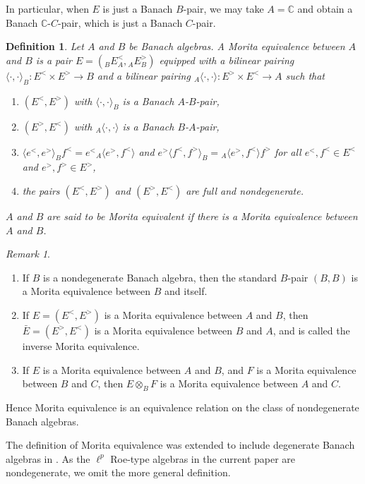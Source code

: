 \documentclass[a4,11pt]{amsart}
\newtheorem{defn}[thm]{Definition}
\theoremstyle{remark}
\newtheorem{rem}[thm]{Remark}
\begin{document}
In particular, when $E$ is just a Banach $B$-pair, we may take $A=\mathbb{C}$ and obtain a Banach $\mathbb{C}$-$C$-pair, which is just a Banach $C$-pair.

\begin{defn}
Let $A$ and $B$ be Banach algebras. A Morita equivalence between $A$ and $B$ is a pair $E=({}_B^{}E^<_A,{}_A^{}E^>_B)$ equipped with a bilinear pairing $\langle\cdot,\cdot\rangle_B:E^<\times E^>\rightarrow B$ and a bilinear pairing ${}_A\langle\cdot,\cdot\rangle:E^>\times E^<\rightarrow A$ such that
\begin{enumerate}
\item $(E^<,E^>)$ with $\langle\cdot,\cdot\rangle_B$ is a Banach $A$-$B$-pair,
\item $(E^>,E^<)$ with ${}_A\langle\cdot,\cdot\rangle$ is a Banach $B$-$A$-pair,
\item $\langle e^<,e^> \rangle_B f^<=e^< {}_A\langle e^>,f^< \rangle$ and $e^>\langle f^<,f^> \rangle_B={}_A\langle e^>,f^< \rangle f^>$ for all $e^<,f^<\in E^<$ and $e^>,f^>\in E^>$,
\item the pairs $(E^<,E^>)$ and $(E^>,E^<)$ are full and nondegenerate.
\end{enumerate}
$A$ and $B$ are said to be Morita equivalent if there is a Morita equivalence between $A$ and $B$.
\end{defn}

\begin{rem} \leavevmode
\begin{enumerate}
\item If $B$ is a nondegenerate Banach algebra, then the standard $B$-pair $(B,B)$ is a Morita equivalence between $B$ and itself.
\item If $E=(E^<,E^>)$ is a Morita equivalence between $A$ and $B$, then $\bar{E}=(E^>,E^<)$ is a Morita equivalence between $B$ and $A$, and is called the inverse Morita equivalence.
\item If $E$ is a Morita equivalence between $A$ and $B$, and $F$ is a Morita equivalence between $B$ and $C$, then $E\otimes_B F$ is a Morita equivalence between $A$ and $C$.
\end{enumerate}
Hence Morita equivalence is an equivalence relation on the class of nondegenerate Banach algebras.
\end{rem}

The definition of Morita equivalence was extended to include degenerate Banach algebras in \cite[Section 1.2]{Par15}. As the $\ell^p$ Roe-type algebras in the current paper are nondegenerate, we omit the more general definition.
\end{document}
